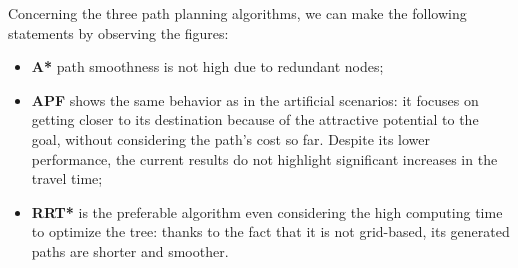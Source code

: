 Concerning the three path planning algorithms, we can make the following statements by observing the figures:
\begin{itemize}[itemsep=0pt]
	\item \textbf{A*} path smoothness is not high due to redundant nodes;
	\item \textbf{APF} shows the same behavior as in the artificial scenarios: it focuses on getting closer to its destination because of the attractive potential to the goal, without considering the path's cost so far. Despite its lower performance, the current results do not highlight significant increases in the travel time;
	\item \textbf{RRT*} is the preferable algorithm even considering the high computing time to optimize the tree: thanks to the fact that it is not grid-based, its generated paths are shorter and smoother.
\end{itemize}  
\vspace{1cm}
